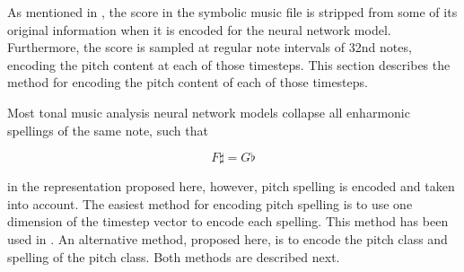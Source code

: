 
As mentioned in , the score in
the symbolic music file is stripped from some of its
original information when it is encoded for the neural
network model. Furthermore, the score is sampled at regular
note intervals of 32nd notes, encoding the pitch content at
each of those timesteps. This section describes the method
for encoding the pitch content of each of those timesteps. 

Most tonal music analysis neural network models collapse all
enharmonic spellings of the same note, such that 

$$F\sharp = G\flat$$

in the representation proposed here, however, pitch spelling
is encoded and taken into account. The easiest method for
encoding pitch spelling is to use one dimension of the
timestep vector to encode each spelling. This method has
been used in \textcite{micchi2020not, micchi2021deep}. An
alternative method, proposed here, is to encode the pitch
class and spelling of the pitch class. Both methods are
described next.
